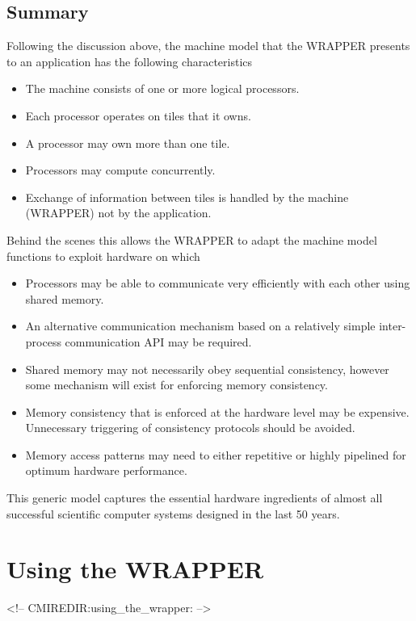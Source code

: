 \newpage
\subsection{Summary}
Following the discussion above, the machine model that the WRAPPER
presents to an application has the following characteristics

\begin{itemize}
\item The machine consists of one or more logical processors.
\item Each processor operates on tiles that it owns.
\item A processor may own more than one tile.
\item Processors may compute concurrently.
\item Exchange of information between tiles is handled by the
  machine (WRAPPER) not by the application.
\end{itemize}
Behind the scenes this allows the WRAPPER to adapt the machine model
functions to exploit hardware on which
\begin{itemize}
\item Processors may be able to communicate very efficiently with each
  other using shared memory.
\item An alternative communication mechanism based on a relatively
  simple inter-process communication API may be required.
\item Shared memory may not necessarily obey sequential consistency,
  however some mechanism will exist for enforcing memory consistency.
\item Memory consistency that is enforced at the hardware level
  may be expensive. Unnecessary triggering of consistency protocols
  should be avoided.
\item Memory access patterns may need to either repetitive or highly
  pipelined for optimum hardware performance.
\end{itemize}

This generic model captures the essential hardware ingredients
of almost all successful scientific computer systems designed in the
last 50 years.

\section{Using the WRAPPER}
\begin{rawhtml}
<!-- CMIREDIR:using_the_wrapper: -->
\end{rawhtml}

